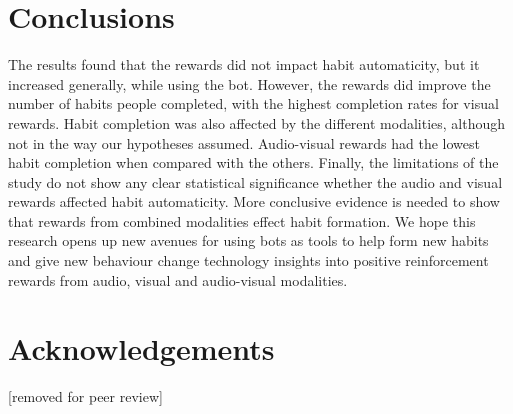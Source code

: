 \documentclass{scaffold/sigchi}
\begin{document}
\section{Conclusions}
The results found that the rewards did not impact habit automaticity, but it increased generally, while using the bot. However, the rewards did improve the number of habits people completed, with the highest completion rates for visual rewards. Habit completion was also affected by the different modalities, although not in the way our hypotheses assumed. Audio-visual rewards had the lowest habit completion when compared with the others. Finally, the limitations of the study do not show any clear statistical significance whether the audio and visual rewards affected habit automaticity. More conclusive evidence is needed to show that rewards from combined modalities effect habit formation. We hope this research opens up new avenues for using bots as tools to help form new habits and give new behaviour change technology insights into positive reinforcement rewards from audio, visual and audio-visual modalities.



\section{Acknowledgements}
[removed for peer review]


\balance{}





\end{document}

